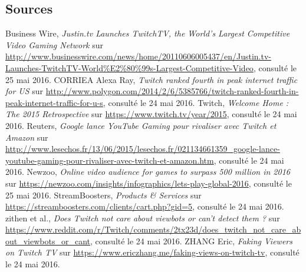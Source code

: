 \documentclass[a4paper]{article}
\begin{document}
\subsection{Sources}
\begin{thebibliography}{10}	
      Business Wire, \textit{Justin.tv Launches TwitchTV, the World’s Largest Competitive Video Gaming Network} sur \url{http://www.businesswire.com/news/home/20110606005437/en/Justin.tv-Launches-TwitchTV-World\%E2\%80\%99s-Largest-Competitive-Video}, consulté le 25 mai 2016.
      CORRIEA Alexa Ray, \textit{Twitch ranked fourth in peak internet traffic for US} sur \url{http://www.polygon.com/2014/2/6/5385766/twitch-ranked-fourth-in-peak-internet-traffic-for-u-s}, consulté le 24 mai 2016.
     Twitch, \textit{Welcome Home : The 2015 Retrospective} sur \url{https://www.twitch.tv/year/2015}, consulté le 24 mai 2016.
     Reuters, \textit{Google lance YouTube Gaming pour rivaliser avec Twitch et Amazon} sur \url{http://www.lesechos.fr/13/06/2015/lesechos.fr/021134661359_google-lance-youtube-gaming-pour-rivaliser-avec-twitch-et-amazon.htm}, consulté le 24 mai 2016.
     Newzoo, \textit{Online video audience for games to surpass 500 million in 2016} sur \url{https://newzoo.com/insights/infographics/lets-play-global-2016}, consulté le 25 mai 2016.     
     StreamBoosters, \textit{Products \& Services} sur \url{https://streamboosters.com/clients/cart.php?gid=5}, consulté le 24 mai 2016.
     zithen et al., \textit{Does Twitch not care about viewbots or can't detect them ?} sur \url{https://www.reddit.com/r/Twitch/comments/2tx23d/does_twitch_not_care_about_viewbots_or_cant}, consulté le 24 mai 2016.
     ZHANG Eric, \textit{Faking Viewers on Twitch TV} sur \url{https://www.ericzhang.me/faking-views-on-twitch-tv}, consulté le 24 mai 2016.
\end{thebibliography}
\end{document}
